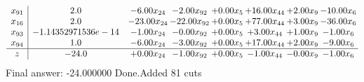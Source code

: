 \documentclass[8pt]{article}
\begin{document}
\[\begin{array}{c| c c@{\hskip 2pt} c@{\hskip 2pt} c@{\hskip 2pt} c@{\hskip 2pt} c@{\hskip 2pt} c@{\hskip 2pt} }
 x_{91}   &  2.0 & -6.00 x_{24} & -2.00 x_{92} & +  0.00 x_{5} & + 16.00 x_{44} & +  2.00 x_{9} & -10.00 x_{6}\\
 x_{16}   &  2.0 & -23.00 x_{24} & -22.00 x_{92} & +  0.00 x_{5} & + 77.00 x_{44} & +  3.00 x_{9} & -36.00 x_{6}\\
 x_{93}   &  -1.14352971536e-14 & -1.00 x_{24} & -0.00 x_{92} & +  0.00 x_{5} & +  3.00 x_{44} & +  1.00 x_{9} & -1.00 x_{6}\\
 x_{94}   &  1.0 & -6.00 x_{24} & -3.00 x_{92} & +  0.00 x_{5} & + 17.00 x_{44} & +  2.00 x_{9} & -9.00 x_{6}\\
\hline
z    &  -24.0 & +  0.00 x_{24} & -1.00 x_{92} & +  0.00 x_{5} & -1.00 x_{44} & -0.00 x_{9} & -1.00 x_{6}\\
\end{array}\]
 Final answer: -24.000000 
Done.Added 81 cuts 
\end{document}
